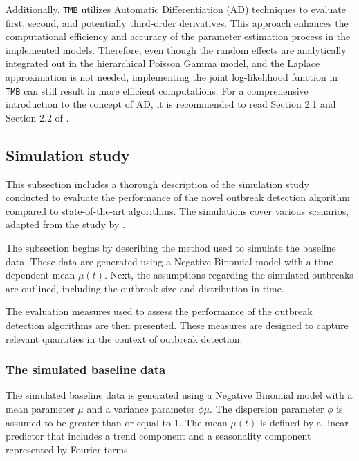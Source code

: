 \documentclass[preprint, 3p, authoryear]{elsarticle} %
\begin{document}
Additionally, \texttt{TMB} utilizes Automatic Differentiation (AD) techniques \citep{Griewank_2008} to evaluate first, second, and potentially third-order derivatives. This approach enhances the computational efficiency and accuracy of the parameter estimation process in the implemented models. Therefore, even though the random effects are analytically integrated out in the hierarchical Poisson Gamma model, and the Laplace approximation is not needed, implementing the joint log-likelihood function in \texttt{TMB} can still result in more efficient computations. For a comprehensive introduction to the concept of AD, it is recommended to read Section 2.1 and Section 2.2 of \citet{Fournier_2012}.

\hypertarget{simulation-study}{%
\subsection{Simulation study}\label{simulation-study}}

This subsection includes a thorough description of the simulation study conducted to evaluate the performance of the novel outbreak detection algorithm compared to state-of-the-art algorithms. The simulations cover various scenarios, adapted from the study by \citet{Noufaily_2013}.

The subsection begins by describing the method used to simulate the baseline data. These data are generated using a Negative Binomial model with a time-dependent mean \(\mu(t)\). Next, the assumptions regarding the simulated outbreaks are outlined, including the outbreak size and distribution in time.

The evaluation measures used to assess the performance of the outbreak detection algorithms are then presented. These measures are designed to capture relevant quantities in the context of outbreak detection.

\hypertarget{the-simulated-baseline-data}{%
\subsubsection{The simulated baseline data}\label{the-simulated-baseline-data}}

The simulated baseline data is generated using a Negative Binomial model with a mean parameter \(\mu\) and a variance parameter \(\phi\mu\). The dispersion parameter \(\phi\) is assumed to be greater than or equal to 1. The mean \(\mu(t)\) is defined by a linear predictor that includes a trend component and a seasonality component represented by Fourier terms.
\end{document}
